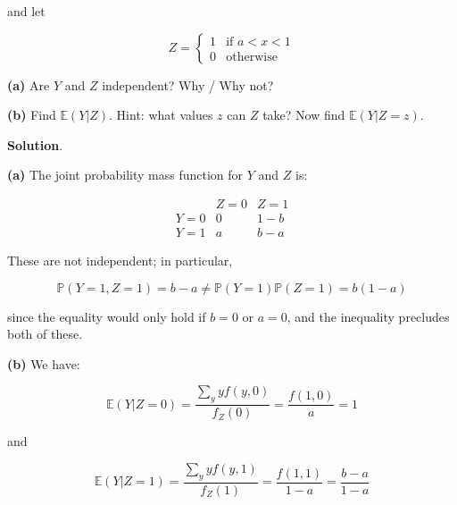 and let

\[
Z = \begin{cases}
1 &\text{if } a < x < 1 \\
0 &\text{otherwise}
\end{cases}
\]

\textbf{(a)} Are \(Y\) and \(Z\) independent? Why / Why not?

\textbf{(b)} Find \(\mathbb{E}(Y | Z)\). Hint: what values \(z\) can
\(Z\) take? Now find \(\mathbb{E}(Y | Z = z)\).

\textbf{Solution}.

\textbf{(a)} The joint probability mass function for \(Y\) and \(Z\) is:

\[
\begin{array}{c|cc}
 & Z = 0 & Z = 1 \\
\hline
Y = 0 & 0 & 1 - b \\
Y = 1 & a & b - a
\end{array}
\]

These are not independent; in particular,

\[ \mathbb{P}(Y = 1, Z = 1) = b - a \neq \mathbb{P}(Y = 1) \mathbb{P}(Z = 1) = b(1 - a) \]

since the equality would only hold if \(b = 0\) or \(a = 0\), and the
inequality precludes both of these.

\textbf{(b)} We have:

\[ \mathbb{E}(Y | Z = 0) = \frac{\sum_y y f(y, 0)}{f_Z(0)} = \frac{f(1, 0)}{a} = 1 \]

and

\[ \mathbb{E}(Y | Z = 1) = \frac{\sum_y y f(y, 1)}{f_Z(1)} = \frac{f(1, 1)}{1 - a} = \frac{b - a}{1 - a} \]
